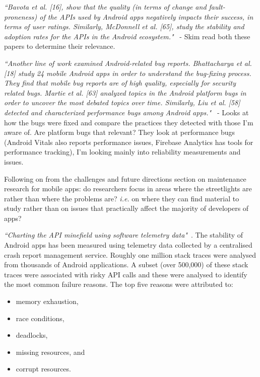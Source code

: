 \emph{``Bavota et al. [16], show that the quality (in terms of change and fault-proneness) of the APIs used by Android apps negatively impacts their success, in terms of user ratings. Similarly, McDonnell et al. [65], study the stability and adoption rates for the APIs in the Android ecosystem."}~\cite[p. 27]{nagappan2016_future_trends_in_sw_eng_for_mobile_apps} - Skim read both these papers to determine their relevance.

\emph{``Another line of work examined Android-related bug reports. Bhattacharya et al. [18] study 24 mobile Android apps in order to understand the bug-fixing process. They find that mobile bug reports are of high quality, especially for security related bugs. Martie et al. [63] analyzed topics in the Android platform bugs in order to uncover the most debated topics over time. Similarly, Liu et al. [58] detected and characterized performance bugs among Android apps."}~\cite[p. 27]{nagappan2016_future_trends_in_sw_eng_for_mobile_apps} - Looks at how the bugs were fixed and compare the practices they detected with those I'm aware of. Are platform bugs that relevant? They look at performance bugs (Android Vitals also reports performance issues, Firebase Analytics has tools for performance tracking), I'm looking mainly into reliability measurements and issues.

Following on from the challenges and future directions section on maintenance research for mobile apps: do researchers focus in areas where the streetlights are rather than where the problems are? \emph{i.e.} on where they can find material to study rather than on issues that practically affect the majority of developers of apps?

\emph{``Charting the API minefield using software telemetry data"}~\cite{Kechagia2015_charting_API_minefield_using_telemetry_data}. The stability of Android apps has been measured using telemetry data collected by a centralised crash report management service. Roughly one million stack traces were analysed from thousands of Android applications. A subset (over 500,000) of these stack traces were associated with risky API calls and these were analysed to identify the most common failure reasons. The top five reasons were attributed to:
    \begin{itemize}
        \item memory exhaustion,
        \item race conditions,
        \item deadlocks,
        \item missing resources, and
        \item corrupt resources.
    \end{itemize}
    
